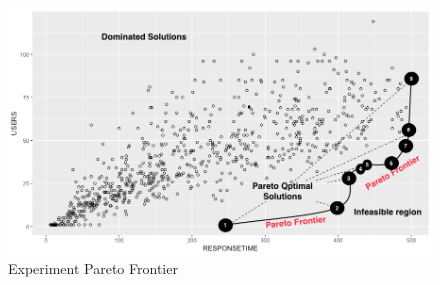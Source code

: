 \documentclass{report}
\begin{document}
\begin{figure}[h]
\centering
\includegraphics[width=1\textwidth]{./images/pareto0curve.png}
    \caption{Experiment Pareto Frontier}
\label{fig:paretofrontier1}
\end{figure}
\end{document}
